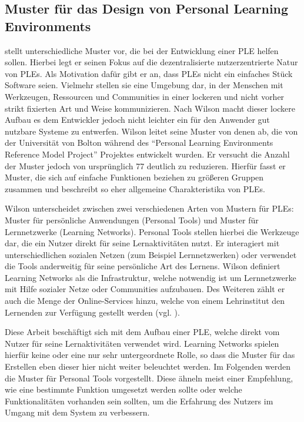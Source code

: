 \subsection{Muster für das Design von Personal Learning Environments}\label{section:wilson_patterns}
\cite{Wilson2008} stellt unterschiedliche Muster vor, die bei der Entwicklung einer PLE helfen sollen. Hierbei legt er seinen Fokus auf die dezentralisierte  nutzerzentrierte Natur von PLEs. Als Motivation dafür gibt er an, dass PLEs nicht ein einfaches Stück Software seien. Vielmehr stellen sie eine Umgebung dar, in der Menschen mit Werkzeugen, Ressourcen und Communities in einer lockeren und nicht vorher strikt fixierten Art und Weise kommunizieren. Nach Wilson macht dieser lockere Aufbau es dem Entwickler jedoch nicht leichter ein für den Anwender gut nutzbare Systeme zu entwerfen. Wilson leitet seine Muster von denen ab, die von der Universität von Bolton während des "`Personal Learning Environments Reference Model Project"' Projektes entwickelt wurden. Er versucht die Anzahl der Muster jedoch von ursprünglich 77 deutlich zu reduzieren. Hierfür fasst er Muster, die sich auf einfache Funktionen beziehen zu größeren Gruppen zusammen und beschreibt so eher allgemeine Charakteristika von PLEs.

Wilson unterscheidet zwischen zwei verschiedenen Arten von Mustern für PLEs: Muster für persönliche Anwendungen (Personal Tools) und Muster für Lernnetzwerke (Learning Networks). Personal Tools stellen hierbei die Werkzeuge dar, die ein Nutzer direkt für seine Lernaktivitäten nutzt. Er interagiert mit unterschiedlichen sozialen Netzen (zum Beispiel Lernnetzwerken) oder verwendet die Tools anderweitig für seine persönliche Art des Lernens. 
Wilson definiert Learning Networks als die Infrastruktur, welche notwendig ist um Lernnetzwerke mit Hilfe sozialer Netze oder Communities aufzubauen. Des Weiteren zählt er auch die Menge der Online-Services hinzu, welche von einem Lehrinstitut den Lernenden zur Verfügung gestellt werden (vgl. \cite{Wilson2008}).

Diese Arbeit beschäftigt sich mit dem Aufbau einer PLE, welche direkt vom Nutzer für seine Lernaktivitäten verwendet wird. Learning Networks spielen hierfür keine oder eine nur sehr untergeordnete Rolle, so dass die Muster für das Erstellen eben dieser hier nicht weiter beleuchtet werden. Im Folgenden werden die Muster für Personal Tools vorgestellt. Diese ähneln meist einer Empfehlung, wie eine bestimmte Funktion umgesetzt werden sollte oder welche Funktionalitäten vorhanden sein sollten, um die Erfahrung des Nutzers im Umgang mit dem System zu verbessern.

